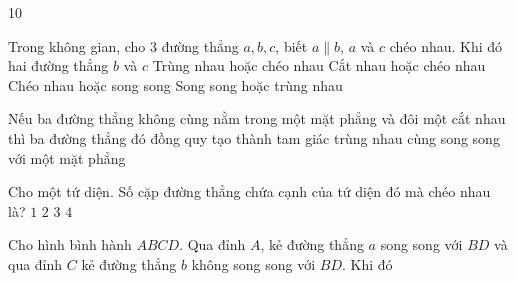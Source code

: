 \begin{indapan}{10}
\begin{ex}
	\loigiai{
	}
\end{ex}
\begin{ex}%
	Trong không gian, cho $3$ đường thẳng $a, b, c$, biết $a\parallel b$, $a$ và $c$ chéo nhau. Khi đó hai đường thẳng $b$ và $c$
	\choice
	{Trùng nhau hoặc chéo nhau}
	{\True Cắt nhau hoặc chéo nhau}
	{Chéo nhau hoặc song song}
	{Song song hoặc trùng nhau}
\end{ex}
\begin{ex}%
	Nếu ba đường thẳng không cùng nằm trong một mặt phẳng và đôi một cắt nhau thì ba đường thẳng đó
	\choice
	{\True đồng quy}
	{tạo thành tam giác}
	{trùng nhau}
	{cùng song song với một mặt phẳng}
\end{ex}
\begin{ex}%
	Cho một tứ diện. Số cặp đường thẳng chứa cạnh của tứ diện đó mà chéo nhau là?
	\choice
	{$1$}
	{$2$}
	{\True $3$}
	{$4$}
	\loigiai{
	}
\end{ex}
\begin{ex}%
	Cho hình bình hành $ABCD$. Qua đỉnh $A$, kẻ đường thẳng $a$ song song với $BD$ và qua đỉnh $C$ kẻ đường thẳng $b$ không song song với $BD$. Khi đó

\end{ex}
\end{indapan}

